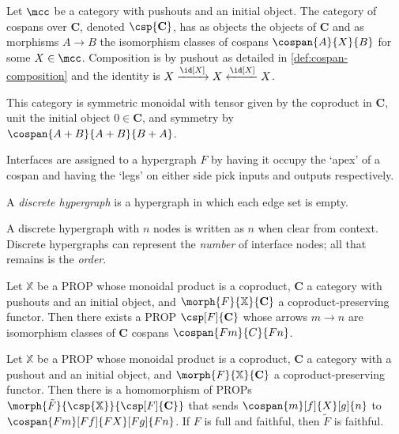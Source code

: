 \begin{definition}
    Let \(\mcc\) be a category with pushouts and an initial object.
    The category of cospans over \(\mathbf{C}\), denoted \(\csp{\mathbf{C}}\),
    has as objects the objects of \(\mathbf{C}\) and as morphisms \(A \to B\)
    the isomorphism classes of cospans \(\cospan{A}{X}{B}\) for some
    \(X \in \mcc\).
    Composition is by pushout as detailed in \cref{def:cospan-composition} and
    the identity is \(X \xrightarrow{\id[X]} X \xleftarrow{\id[X]} X\).

    This category is symmetric monoidal with tensor given by the coproduct in
    \(\mathbf{C}\), unit the initial object \(0 \in \mathbf{C}\), and symmetry
    by \(\cospan{A+B}{A+B}{B+A}\).
\end{definition}

Interfaces are assigned to a hypergraph \(F\) by having it occupy the `apex' of
a cospan and having the `legs' on either side pick inputs and outputs
respectively.

\begin{definition}
    A \emph{discrete hypergraph} is a hypergraph in which each edge set is
    empty.
\end{definition}

A discrete hypergraph with \(n\) nodes is written as \(n\) when clear from
context.
Discrete hypergraphs can represent the \emph{number} of interface nodes; all
that remains is the \emph{order}.

\begin{theorem}
    Let \(\mathbb{X}\) be a PROP whose monoidal product is a coproduct,
    \(\mathbf{C}\) a category with pushouts and an initial object, and \(
        \morph{F}{\mathbb{X}}{\mathbf{C}}
    \) a coproduct-preserving functor.
    Then there exists a PROP \(\csp[F]{\mathbf{C}}\) whose arrows \(m \to n\)
    are isomorphism classes of \(\mathbf{C}\) cospans \(\cospan{Fm}{C}{Fn}\).
\end{theorem}


\begin{theorem}
    \label{thm:cospan-homomorphism}
    Let \(\mathbb{X}\) be a PROP whose monoidal product is a coproduct,
    \(\mathbf{C}\) a category with a pushout and an initial object, and
    \(\morph{F}{\mathbb{X}}{\mathbf{C}}\) a coproduct-preserving functor.
    Then there is a homomorphism of PROPs \(
        \morph{\tilde{F}}{\csp{\mathbb{X}}}{\csp[F]{\mathbf{C}}}
    \) that sends \(\cospan{m}[f]{X}[g]{n}\) to \(\cospan{Fm}[Ff]{FX}[Fg]{Fn}\).
    If \(F\) is full and faithful, then \(\tilde{F}\) is faithful.
\end{theorem}

